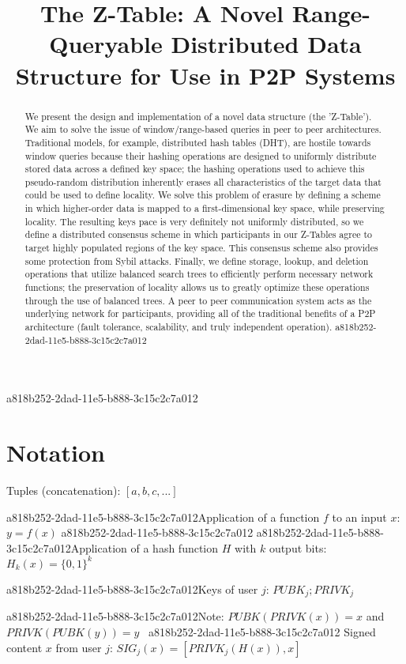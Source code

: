 \documentclass[12pt]{article}
\title{The Z-Table: A Novel Range-Queryable Distributed Data Structure for Use in P2P Systems}
\begin{document}
\maketitle

a818b252-2dad-11e5-b888-3c15c2c7a012\begin{abstract}
We present the design and implementation of a novel data structure (the 'Z-Table'). We aim to solve the issue of window/range-based queries in peer to peer architectures. Traditional models, for example,  distributed hash tables (DHT), are hostile towards window queries because their hashing operations are designed to uniformly distribute stored data across a defined key space; the hashing operations used to achieve this pseudo-random distribution inherently erases all characteristics of the target data that could be used to define locality. We solve this problem of erasure by defining a scheme in which higher-order data is mapped to a first-dimensional key space, while preserving locality. The resulting keys pace is very definitely not uniformly distributed, so we define a distributed consensus scheme in which participants in our Z-Tables agree to target highly populated regions of the key space. This consensus scheme also provides some protection from Sybil attacks. Finally, we define storage, lookup, and deletion operations that utilize balanced search trees to efficiently perform necessary network functions; the preservation of locality allows us to greatly optimize these operations through the use of balanced trees. A peer to peer communication system acts as the underlying network for participants, providing all of the traditional benefits of a P2P architecture (fault tolerance, scalability, and truly independent operation).
a818b252-2dad-11e5-b888-3c15c2c7a012\end{abstract}

\section{Notation}

Tuples (concatenation): $[a,b,c,...]$

a818b252-2dad-11e5-b888-3c15c2c7a012Application of a function $f$ to an input $x$: $y=f(x)$
a818b252-2dad-11e5-b888-3c15c2c7a012
a818b252-2dad-11e5-b888-3c15c2c7a012Application of a hash function $H$ with $k$ output bits: $H_{k}(x) = \{0,1\}^k$

a818b252-2dad-11e5-b888-3c15c2c7a012Keys of user $j$: $ PUBK_j; PRIVK_j $

a818b252-2dad-11e5-b888-3c15c2c7a012Note: $PUBK(PRIVK(x)) = x$ and $PRIVK(PUBK(y)) = y$~
a818b252-2dad-11e5-b888-3c15c2c7a012
Signed content $x$ from user $j$: $SIG_j(x) = \left[ PRIVK_j( H(x) ), x \right]$
\end{document}
